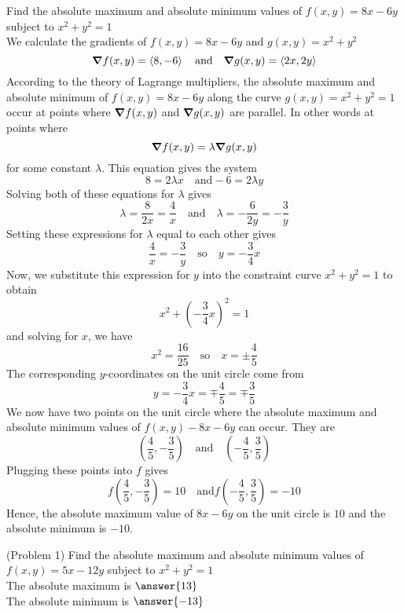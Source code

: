 \documentclass[handout]{ximera}
\begin{document}
\begin{example}[Example 1]
Find the absolute maximum and absolute minimum values of $f(x,y) = 8x - 6y$ subject to $x^2 + y^2 = 1$\\
We calculate the gradients of $f(x,y) = 8x - 6y$ and $g(x,y) = x^2 + y^2$
\[
\boldsymbol\nabla f(x,y) = \left\langle 8, -6\right\rangle \quad \text{and} \quad \boldsymbol\nabla g(x,y) = \left\langle 2x, 2y\right\rangle
\]
According to the theory of Lagrange multipliers, the absolute maximum and absolute minimum of $f(x,y) = 8x - 6y$
along the curve $g(x,y) = x^2 + y^2 = 1$ occur at points where $\boldsymbol\nabla f(x,y)$ and $\boldsymbol\nabla g(x,y)$ are parallel.  In other words at points where
\[
\boldsymbol\nabla f(x,y) = \lambda \boldsymbol\nabla g(x,y)
\]
for some constant $\lambda$.
This equation gives the system
\[
8 = 2\lambda x \quad \text{and} -6 = 2\lambda y
\]
Solving both of these equations for $\lambda$ gives
\[
\lambda = \frac{8}{2x} = \frac{4}{x} \quad \text{and} \quad \lambda = -\frac{6}{2y} = -\frac{3}{y}
\]
Setting these expressions for $\lambda$ equal to each other gives
\[
\frac{4}{x} = -\frac{3}{y} \quad \text{so} \quad y = -\frac34 x
\]
Now, we substitute this expression for $y$ into the constraint curve $x^2 + y^2 = 1$ to obtain
\[
x^2 + \left(-\frac34 x\right)^2 = 1
\]
and solving for $x$, we have
\[
x^2 = \frac{16}{25} \quad \text{so} \quad x = \pm \frac45
\]
The corresponding $y$-coordinates on the unit circle come from 
\[
y = -\frac34 x = \mp \frac45 = \mp \frac35
\]
We now have two points on the unit circle where the absolute maximum and absolute minimum values of $f(x,y) - 8x - 6y$ can occur.
They are
\[
\left(\frac45, -\frac35\right) \quad \text{and} \quad \left(-\frac45, \frac35\right)
\]
Plugging these points into $f$ gives
\[
f\left(\frac45, -\frac35\right) = 10 \quad \text{and} f\left(-\frac45, \frac35\right) = -10
\]
Hence, the absolute maximum value of $8x -6y$ on the unit circle is $10$ and the absolute minimum is $-10$.
\end{example}

\begin{problem}(Problem 1)
Find the absolute maximum and absolute minimum values of $f(x,y) = 5x -12y$ subject to $x^2 + y^2 = 1$\\
The absolute maximum is $\answer{13}$\\
The absolute minimum is $\answer{-13}$
\end{problem}
\end{document}
